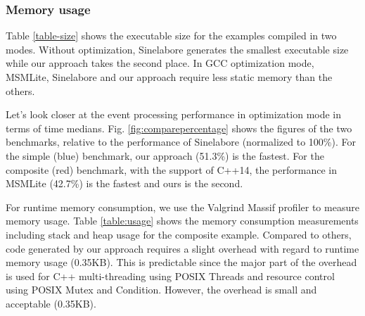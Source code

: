 \subsubsection{Memory usage} 
Table \ref{table-size} shows the executable size for the examples compiled in two modes.
Without optimization, Sinelabore generates the smallest executable size while our approach takes the second place.
In GCC optimization mode, MSMLite, Sinelabore and our approach require less static memory than the others. 

Let's look closer at the event processing performance in optimization mode in terms of time medians.
Fig. \ref{fig:comparepercentage} shows the figures of the two benchmarks, relative to the performance of Sinelabore (normalized to 100\%).
For the simple (blue) benchmark, our approach (51.3\%) is the fastest. 
For the composite (red) benchmark, with the support of C++14, the performance in MSMLite (42.7\%) is the fastest and ours is the second.   

For runtime memory consumption, we use the Valgrind Massif profiler \cite{Massif,nethercote2007valgrind} to measure memory usage. 
Table \ref{table:usage} shows the memory consumption measurements including stack and heap usage for the composite example. 
Compared to others, code generated by our approach requires a slight overhead with regard to runtime memory usage (0.35KB).
This is predictable since the major part of the overhead is used for C++ multi-threading using POSIX Threads and resource control using POSIX Mutex and Condition. 
However, the overhead is small and acceptable (0.35KB). 

